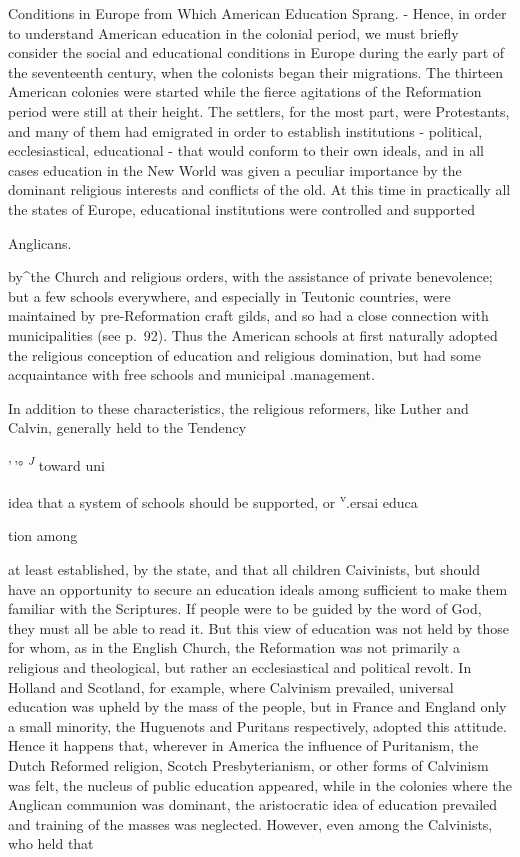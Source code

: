 \documentclass[
]{book}
\begin{document}
Conditions in Europe from Which American Education Sprang. - Hence, in order to understand American education in the colonial period, we must briefly consider the social and educational conditions in Europe during the early part of the seventeenth century, when the colonists began their migrations. The thirteen American colonies were started while the fierce agitations of the Reformation period were still at their height. The settlers, for the most part, were Protestants, and many of them had emigrated in order to establish institutions - political, ecclesiastical, educational - that would conform to their own ideals, and in all cases education in the New World was given a peculiar importance by the dominant religious interests and conflicts of the old. At this time in practically all the states of Europe, educational institutions were controlled and supported

Anglicans.

by\^{}the Church and religious orders, with the assistance of private benevolence; but a few schools everywhere, and especially in Teutonic countries, were maintained by pre-Reformation craft gilds, and so had a close connection with municipalities (see p.~92). Thus the American schools at first naturally adopted the religious conception of education and religious domination, but had some acquaintance with free schools and municipal .management.

In addition to these characteristics, the religious reformers, like Luther and Calvin, generally held to the Tendency

'\,'° \emph{\textsuperscript{J}} toward uni

idea that a system of schools should be supported, or \textsuperscript{v}.ersai educa

tion among

at least established, by the state, and that all children Caivinists, but should have an opportunity to secure an education ideals among sufficient to make them familiar with the Scriptures. If people were to be guided by the word of God, they must all be able to read it. But this view of education was not held by those for whom, as in the English Church, the Reformation was not primarily a religious and theological, but rather an ecclesiastical and political revolt. In Holland and Scotland, for example, where Calvinism prevailed, universal education was upheld by the mass of the people, but in France and England only a small minority, the Huguenots and Puritans respectively, adopted this attitude. Hence it happens that, wherever in America the influence of Puritanism, the Dutch Reformed religion, Scotch Presbyterianism, or other forms of Calvinism was felt, the nucleus of public education appeared, while in the colonies where the Anglican communion was dominant, the aristocratic idea of education prevailed and training of the masses was neglected. However, even among the Calvinists, who held that
\end{document}
